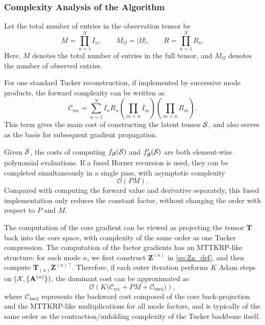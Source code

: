 \subsubsection{Complexity Analysis of the Algorithm}

Let the total number of entries in the observation tensor be
\begin{equation}
M = \prod_{n=1}^{N} I_n,
\qquad
M_\Omega = |\Omega|,
\qquad
R=\prod_{n=1}^{N}R_n.
\end{equation}
Here, $M$ denotes the total number of entries in the full tensor, and $M_\Omega$ denotes the number of observed entries.

For one standard Tucker reconstruction, if implemented by successive mode products, the forward complexity can be written as
\begin{equation}
\mathcal C_{\mathrm{rec}}
=
\sum_{n=1}^{N}
I_nR_n
\left(\prod_{m<n} I_m\right)
\left(\prod_{m>n} R_m\right).
\label{eq:tucker_reconstruction_complexity}
\end{equation}
This term gives the main cost of constructing the latent tensor $\mathcal{S}$, and also serves as the basis for subsequent gradient propagation.

Given $\mathcal{S}$, the costs of computing $f_{\boldsymbol\beta}(\mathcal{S})$ and $f'_{\boldsymbol\beta}(\mathcal{S})$ are both element-wise polynomial evaluations. If a fused Horner recursion is used, they can be completed simultaneously in a single pass, with asymptotic complexity
\begin{equation}
\mathcal O(PM).
\end{equation}
Compared with computing the forward value and derivative separately, this fused implementation only reduces the constant factor, without changing the order with respect to $P$ and $M$.

The computation of the core gradient can be viewed as projecting the tensor $\mathbf T$ back into the core space, with complexity of the same order as one Tucker compression. The computation of the factor gradients has an MTTKRP-like structure: for each mode $n$, we first construct $\mathbf Z^{(n)}$ in \eqref{eq:Zn_def}, and then compute $\mathbf T_{(n)}\mathbf Z^{(n)\top}$. Therefore, if each outer iteration performs $K$ Adam steps on $(\mathcal{X},\{\mathbf A^{(n)}\})$, the dominant cost can be approximated as
\begin{equation}
\mathcal O\!\left(
K\bigl(\mathcal C_{\mathrm{rec}} + PM + \mathcal C_{\mathrm{bwd}}\bigr)
\right),
\label{eq:grad_update_complexity}
\end{equation}
where $\mathcal C_{\mathrm{bwd}}$ represents the backward cost composed of the core back-projection and the MTTKRP-like multiplications for all mode factors, and is typically of the same order as the contraction/unfolding complexity of the Tucker backbone itself.


